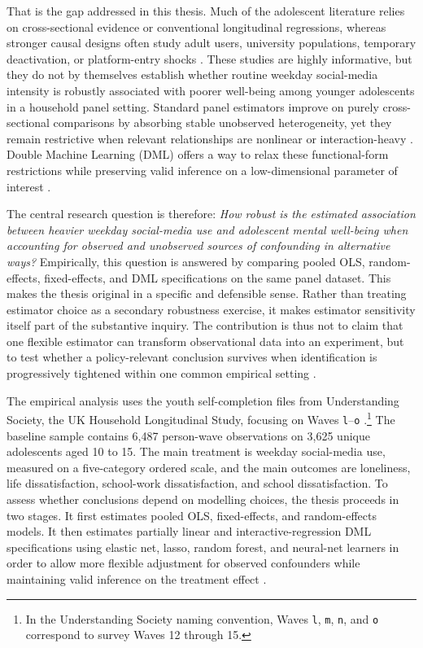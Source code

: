 \documentclass[11pt,oneside,a4paper]{book}
\begin{document}
That is the gap addressed in this thesis. Much of the adolescent literature relies on cross-sectional evidence or conventional longitudinal regressions, whereas stronger causal designs often study adult users, university populations, temporary deactivation, or platform-entry shocks \citep{orbenprzybylski2019association,orben2022windows,allcott2020welfare,braghieri2022socialmedia}. These studies are highly informative, but they do not by themselves establish whether routine weekday social-media intensity is robustly associated with poorer well-being among younger adolescents in a household panel setting. Standard panel estimators improve on purely cross-sectional comparisons by absorbing stable unobserved heterogeneity, yet they remain restrictive when relevant relationships are nonlinear or interaction-heavy \citep{athey2019mlmethods,baiardi2024valueadded,knaus2021musicdml,helal2026returns}. Double Machine Learning (DML) offers a way to relax these functional-form restrictions while preserving valid inference on a low-dimensional parameter of interest \citep{chernozhukov2018dml,bach2024doubleml,fuhr2024dml}.

The central research question is therefore: \emph{How robust is the estimated association between heavier weekday social-media use and adolescent mental well-being when accounting for observed and unobserved sources of confounding in alternative ways?} Empirically, this question is answered by comparing pooled OLS, random-effects, fixed-effects, and DML specifications on the same panel dataset. This makes the thesis original in a specific and defensible sense. Rather than treating estimator choice as a secondary robustness exercise, it makes estimator sensitivity itself part of the substantive inquiry. The contribution is thus not to claim that one flexible estimator can transform observational data into an experiment, but to test whether a policy-relevant conclusion survives when identification is progressively tightened within one common empirical setting \citep{chernozhukov2018dml,bach2024doubleml,baiardi2024valueadded}.

The empirical analysis uses the youth self-completion files from Understanding Society, the UK Household Longitudinal Study, focusing on Waves \texttt{l}--\texttt{o} \citep{iser2025understandingsociety}.\footnote{In the Understanding Society naming convention, Waves \texttt{l}, \texttt{m}, \texttt{n}, and \texttt{o} correspond to survey Waves 12 through 15.} The baseline sample contains 6,487 person-wave observations on 3,625 unique adolescents aged 10 to 15. The main treatment is weekday social-media use, measured on a five-category ordered scale, and the main outcomes are loneliness, life dissatisfaction, school-work dissatisfaction, and school dissatisfaction. To assess whether conclusions depend on modelling choices, the thesis proceeds in two stages. It first estimates pooled OLS, fixed-effects, and random-effects models. It then estimates partially linear and interactive-regression DML specifications using elastic net, lasso, random forest, and neural-net learners in order to allow more flexible adjustment for observed confounders while maintaining valid inference on the treatment effect \citep{chernozhukov2018dml,bach2024doubleml}.
\end{document}
